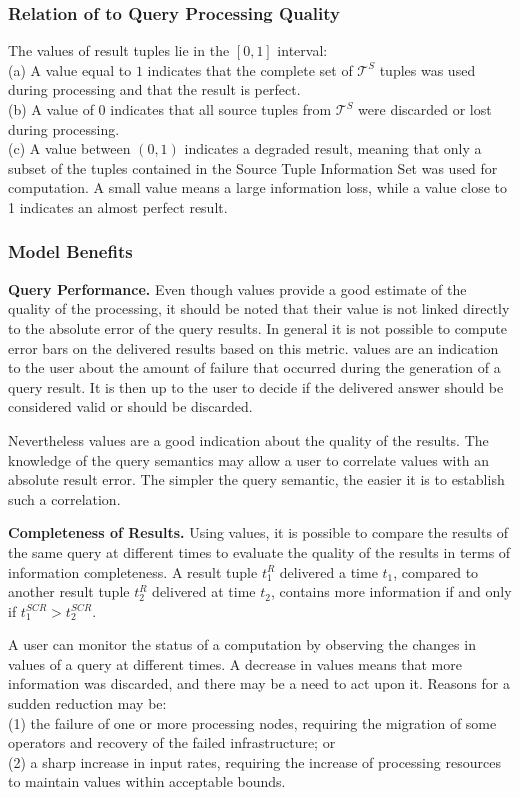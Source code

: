 \subsubsection*{Relation of \sic to Query Processing Quality} 
The \sic values of result tuples lie in the $[0,1]$ interval: \\
(a) A value equal to $1$ indicates that the complete set of $\mathcal{T}^{S}$ tuples was
used during processing and that the result is perfect. \\
(b) A value of $0$ indicates that all source tuples from $\mathcal{T}^{S}$
were discarded or lost during processing. \\  
(c) A value between $(0,1)$ indicates a degraded result, meaning that only a subset of the tuples
contained in the Source Tuple Information Set was used for computation. A small value means a
large information loss, while a value close to 1 indicates an almost perfect result. 
\subsubsection*{Model Benefits}

\textbf{Query Performance.} Even though \sic values provide a good estimate of the quality of the
processing, it should be noted that their value is not linked directly to the absolute error of the query
results. In general it is not possible to compute error bars on the delivered results based on this
metric.
\sic values are an indication to the user about the amount of failure that occurred during the generation
of a query result. It is then up to the user to decide if the delivered answer should be considered valid
or should be discarded. 

Nevertheless \sic values are a good indication about the quality of the results. The
knowledge of the query semantics may allow a user to correlate \sic values with an absolute result error. 
The simpler the query semantic, the easier it is to establish such a correlation. 

\textbf{Completeness of Results.} Using \sic values, it is possible to compare the results of the same
query at different times to evaluate the quality of the results in terms of information
completeness. A result tuple $t^R_1$ delivered a time $t_1$, compared to another result tuple $t^R_2$
delivered at time $t_2$, contains more information if and only if $t^{SCR}_1 > t^{SCR}_2$.

A user can monitor the status of a computation by observing the changes in \sic values of a
query at different times. A decrease in \sic values means that more information was
discarded, and there may be a need to act upon it. Reasons for a sudden reduction may be:\\
(1) the failure of one or more processing nodes, requiring the migration of some operators and
recovery of the failed infrastructure; or\\
(2) a sharp increase in input rates, requiring the increase of processing resources to maintain \sic
values within acceptable bounds.

